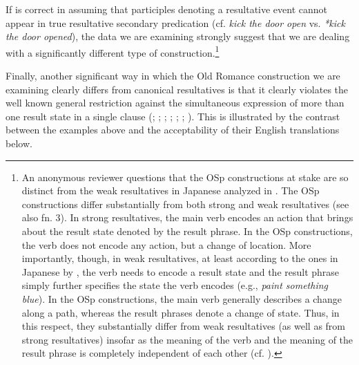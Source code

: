\documentclass[output=paper,colorlinks,citecolor=brown,
]{langscibook}
\begin{document}
If \citet{Embick2004} is correct in assuming that participles denoting a resultative event cannot appear in true resultative secondary predication (cf. \textit{kick the door open} vs. \textit{*kick the door opened}), the data we are examining strongly suggest that we are dealing with a significantly different type of construction.\footnote{An anonymous reviewer questions that the OSp constructions at stake are so distinct from the weak resultatives in Japanese analyzed in \citet{Washio1997}. The OSp constructions differ substantially from both strong and weak resultatives (see also fn. 3). In strong resultatives, the main verb encodes an action that brings about the result state denoted by the result phrase. In the OSp constructions, the verb does not encode any action, but a change of location. More importantly, though, in weak resultatives, at least according to the ones in Japanese by \citeauthor{Washio1997}, the verb needs to encode a result state and the result phrase simply further specifies the state the verb encodes (e.g., \emph{paint something blue}). In the OSp constructions, the main verb generally describes a change along a path, whereas the result phrases denote a change of state. Thus, in this respect, they substantially differ from weak resultatives (as well as from strong resultatives) insofar as the meaning of the verb and the meaning of the result phrase is completely independent of each other (cf. \citealp{Washio1997}). }

Finally, another significant way in which the Old Romance construction we are examining clearly differs from canonical resultatives is that it clearly violates the well known general restriction against the simultaneous expression of more than one result state in a single clause (\citealt{Goldberg1991}; \citealt{Tenny1994}; \citealt{LevinAndRappaportHovav1995}; \citealt{Tortora1998}; \citealt{RappaportHovav2008}; \citealt{BeaversAndKoontz-Garboden2017}; \citealt{Ausensi2019a,Ausensi2021,Ausensi2020c}). This is illustrated by the contrast between the examples above and the acceptability of their English translations below. 

\ea
  \z 
\z 
\end{document}
